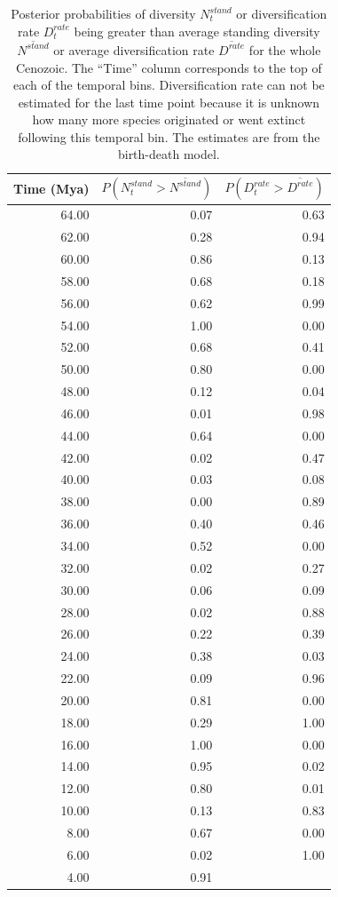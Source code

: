 \begin{table}[ht]
  \centering
  \caption[Posterior probability estimates of a peak in diversity, diversification]{Posterior probabilities of diversity \(N^{stand}_{t}\) or diversification rate \(D^{rate}_{t}\) being greater than average standing diversity \(\overline{N^{stand}}\) or average diversification rate \(\overline{D^{rate}}\) for the whole Cenozoic. The ``Time'' column corresponds to the top of each of the temporal bins. Diversification rate can not be estimated for the last time point because it is unknown how many more species originated or went extinct following this temporal bin. The estimates are from the birth-death model.}
  \label{tab:div_peak}
  \begin{tabular}{ r r r }
    \hline
    Time (Mya) & \(P(N^{stand}_{t} > \overline{N^{stand}})\) & \(P(D^{rate}_{t} > \overline{D^{rate}})\) \\ 
    \hline
    64.00 & 0.07 & 0.63 \\ 
    62.00 & 0.28 & 0.94 \\ 
    60.00 & 0.86 & 0.13 \\ 
    58.00 & 0.68 & 0.18 \\ 
    56.00 & 0.62 & 0.99 \\ 
    54.00 & 1.00 & 0.00 \\ 
    52.00 & 0.68 & 0.41 \\ 
    50.00 & 0.80 & 0.00 \\ 
    48.00 & 0.12 & 0.04 \\ 
    46.00 & 0.01 & 0.98 \\ 
    44.00 & 0.64 & 0.00 \\ 
    42.00 & 0.02 & 0.47 \\ 
    40.00 & 0.03 & 0.08 \\ 
    38.00 & 0.00 & 0.89 \\ 
    36.00 & 0.40 & 0.46 \\ 
    34.00 & 0.52 & 0.00 \\ 
    32.00 & 0.02 & 0.27 \\ 
    30.00 & 0.06 & 0.09 \\ 
    28.00 & 0.02 & 0.88 \\ 
    26.00 & 0.22 & 0.39 \\ 
    24.00 & 0.38 & 0.03 \\ 
    22.00 & 0.09 & 0.96 \\ 
    20.00 & 0.81 & 0.00 \\ 
    18.00 & 0.29 & 1.00 \\ 
    16.00 & 1.00 & 0.00 \\ 
    14.00 & 0.95 & 0.02 \\ 
    12.00 & 0.80 & 0.01 \\ 
    10.00 & 0.13 & 0.83 \\ 
    8.00 & 0.67 & 0.00 \\ 
    6.00 & 0.02 & 1.00 \\ 
    4.00 & 0.91 &  \\ 
    \hline
  \end{tabular}
\end{table}




